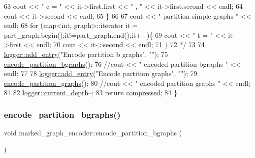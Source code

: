 \begin{DoxyCode}
63 \textcolor{comment}{    cout << " c = " << it->first.first << " , " << it->first.second << endl;}
64 \textcolor{comment}{    cout << it->second << endl;}
65 \textcolor{comment}{  \}}
66 \textcolor{comment}{}
67 \textcolor{comment}{  cout << " partition simple graphs " << endl;}
68 \textcolor{comment}{  for (map<int, graph>::iterator it = part\_graph.begin();it!=part\_graph.end();it++)\{}
69 \textcolor{comment}{    cout << " t = " << it->first << endl;}
70 \textcolor{comment}{    cout << it->second << endl;}
71 \textcolor{comment}{  \}}
72 \textcolor{comment}{  */}
73 
74   \hyperlink{classlogger_a710163deb17bc81f70d53d285b8ac9ac}{logger::add\_entry}(\textcolor{stringliteral}{"Encode partition b graphs"}, \textcolor{stringliteral}{""});
75   \hyperlink{classmarked__graph__encoder_aa113c4870e3221faa332b2151b63d9e6}{encode\_partition\_bgraphs}();
76   \textcolor{comment}{//cout << " encoded partition bgraphs " << endl;}
77 
78   \hyperlink{classlogger_a710163deb17bc81f70d53d285b8ac9ac}{logger::add\_entry}(\textcolor{stringliteral}{"Encode partition graphs"}, \textcolor{stringliteral}{""});
79   \hyperlink{classmarked__graph__encoder_a654463d4b256b84225f5944b5e361ebf}{encode\_partition\_graphs}();
80   \textcolor{comment}{//cout << " encoded partition graphs " << endl;}
81   
82   \hyperlink{classlogger_a9d29b49bd318a719a8e85b59eac54fe0}{logger::current\_depth}--;
83   \textcolor{keywordflow}{return} \hyperlink{classmarked__graph__encoder_ac2ded200860fdd2321f86dd76b28bcb3}{compressed};
84 \}
\end{DoxyCode}
\mbox{\label{classmarked__graph__encoder_aa113c4870e3221faa332b2151b63d9e6}} 
\subsubsection{\texorpdfstring{encode\+\_\+partition\+\_\+bgraphs()}{encode\_partition\_bgraphs()}}
{\footnotesize\ttfamily void marked\+\_\+graph\+\_\+encoder\+::encode\+\_\+partition\+\_\+bgraphs (\begin{DoxyParamCaption}{ }\end{DoxyParamCaption})\hspace{0.3cm}{\ttfamily [private]}}



